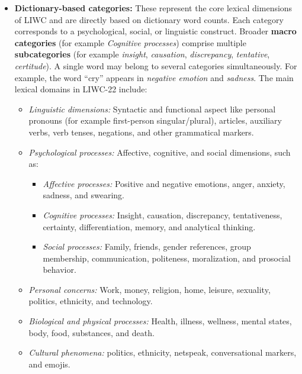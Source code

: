 \begin{itemize}
    \item \textbf{Dictionary-based categories:} These represent the core lexical dimensions of LIWC and are directly based on dictionary word counts. Each category corresponds to a psychological, social, or linguistic construct. Broader \textbf{macro categories} (for example \textit{Cognitive processes}) comprise multiple \textbf{subcategories} (for example \textit{insight}, \textit{causation}, \textit{discrepancy}, \textit{tentative}, \textit{certitude}). A single word may belong to several categories simultaneously. For example, the word “cry” appears in \textit{negative emotion} and \textit{sadness}. The main lexical domains in LIWC-22 include:
        \begin{itemize}
            \item \textit{Linguistic dimensions:} Syntactic and functional aspect like personal pronouns (for example first-person singular/plural), articles, auxiliary verbs, verb tenses, negations, and other grammatical markers.
            \item \textit{Psychological processes:} Affective, cognitive, and social dimensions, such as:
                \begin{itemize}
                    \item \textit{Affective processes:} Positive and negative emotions, anger, anxiety, sadness, and swearing.
                    \item \textit{Cognitive processes:} Insight, causation, discrepancy, tentativeness, certainty, differentiation, memory, and analytical thinking.
                    \item \textit{Social processes:} Family, friends, gender references, group membership, communication, politeness, moralization, and prosocial behavior.
                \end{itemize}
            \item \textit{Personal concerns:} Work, money, religion, home, leisure, sexuality, politics, ethnicity, and technology.
            \item \textit{Biological and physical processes:} Health, illness, wellness, mental states, body, food, substances, and death.
            \item \textit{Cultural phenomena:} politics, ethnicity, netspeak, conversational markers, and emojis.
        \end{itemize}


\end{itemize}
